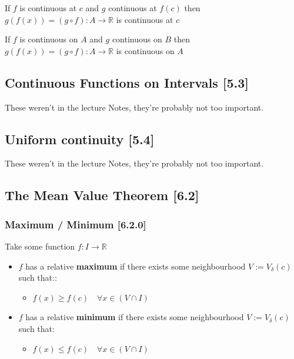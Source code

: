 \documentclass[class=article, crop=false]{standalone}
\begin{document}
If \(f\) is continuous at \(c\) and \(g\) continuous at \(f(c)\) then
\(g\left( f\left( x\right) \right) = \left(g \circ f \right): A \rightarrow \mathbb{R}\)
is continuous at \(c\)

If \(f\) is continuous on \(A\) and \(g\) continuous on \(B\) then
\(g\left( f\left( x\right) \right) = \left(g \circ f \right): A \rightarrow \mathbb{R}\)
is continuous on \(A\)

\hypertarget{header-n3979}{%
\subsection{Continuous Functions on Intervals
{[}5.3{]}}\label{header-n3979}}

These weren't in the lecture Notes, they're probably not too important.

\hypertarget{header-n3981}{%
\subsection{Uniform continuity {[}5.4{]}}\label{header-n3981}}

These weren't in the lecture Notes, they're probably not too important.

\hypertarget{header-n3984}{%
\subsection{The Mean Value Theorem {[}6.2{]}}\label{header-n3984}}

\hypertarget{header-n3985}{%
\subsubsection{Maximum / Minimum {[}6.2.0{]}}\label{header-n3985}}

Take some function \(f: I \rightarrow \mathbb{R}\)

\begin{itemize}
\item
  \(f\) has a relative \textbf{maximum} if there exists some
  neighbourhood \(V:=V_{\delta}\left( c \right)\) such that::

  \begin{itemize}
  \item
    \(f(x) \geq f(c) \quad \forall x \in \left( V\cap I \right)\)
  \end{itemize}
\item
  \(f\) has a relative \textbf{minimum} if there exists some
  neighbourhood \(V:=V_{\delta}\left( c \right)\) such that:

  \begin{itemize}
  \item
    \(f(x) \leq f(c) \quad \forall x \in \left( V\cap I \right)\)
  \end{itemize}
\end{itemize}
\end{document}
